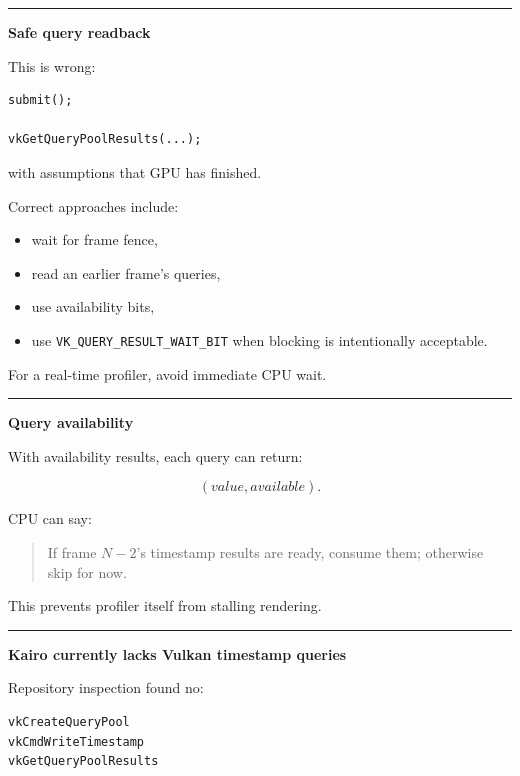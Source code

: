 \begin{center}\rule{0.5\linewidth}{0.5pt}\end{center}

\textbf{Safe query readback}

This is wrong:

\begin{verbatim}
submit();

vkGetQueryPoolResults(...);
\end{verbatim}

with assumptions that GPU has finished.

Correct approaches include:

\begin{itemize}
\tightlist
\item
  wait for frame fence,
\item
  read an earlier frame's queries,
\item
  use availability bits,
\item
  use \texttt{VK\_QUERY\_RESULT\_WAIT\_BIT} when blocking is intentionally acceptable.
\end{itemize}

For a real-time profiler, avoid immediate CPU wait.

\begin{center}\rule{0.5\linewidth}{0.5pt}\end{center}

\textbf{Query availability}

With availability results, each query can return:

\[
(value,available).
\]

CPU can say:

\begin{quote}
If frame \(N-2\)'s timestamp results are ready, consume them; otherwise skip for now.
\end{quote}

This prevents profiler itself from stalling rendering.

\begin{center}\rule{0.5\linewidth}{0.5pt}\end{center}

\textbf{Kairo currently lacks Vulkan timestamp queries}

Repository inspection found no:

\begin{verbatim}
vkCreateQueryPool
vkCmdWriteTimestamp
vkGetQueryPoolResults
\end{verbatim}

